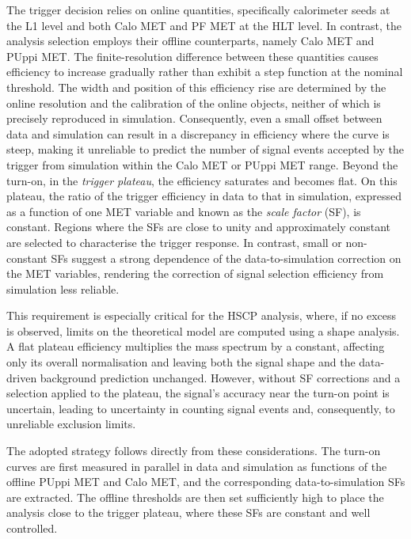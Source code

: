 The trigger decision relies on online quantities, specifically calorimeter seeds at the L1 level and both Calo MET and PF MET at the HLT level. In contrast, the analysis selection employs their offline counterparts, namely Calo MET and PUppi MET. The finite-resolution difference between these quantities causes efficiency to increase gradually rather than exhibit a step function at the nominal threshold. The width and position of this efficiency rise are determined by the online resolution and the calibration of the online objects, neither of which is precisely reproduced in simulation. Consequently, even a small offset between data and simulation can result in a discrepancy in efficiency where the curve is steep, making it unreliable to predict the number of signal events accepted by the trigger from simulation within the Calo MET or PUppi MET range. Beyond the turn-on, in the \textit{trigger plateau}, the efficiency saturates and becomes flat. On this plateau, the ratio of the trigger efficiency in data to that in simulation, expressed as a function of one MET variable and known as the \textit{scale factor} (SF), is constant. Regions where the SFs are close to unity and approximately constant are selected to characterise the trigger response. In contrast, small or non-constant SFs suggest a strong dependence of the data-to-simulation correction on the MET variables, rendering the correction of signal selection efficiency from simulation less reliable.

This requirement is especially critical for the HSCP analysis, where, if no excess is observed, limits on the theoretical model are computed using a shape analysis. A flat plateau efficiency multiplies the mass spectrum by a constant, affecting only its overall normalisation and leaving both the signal shape and the data-driven background prediction unchanged. However, without SF corrections and a selection applied to the plateau, the signal's accuracy near the turn-on point is uncertain, leading to uncertainty in counting signal events and, consequently, to unreliable exclusion limits.

The adopted strategy follows directly from these considerations. The turn-on curves are first measured in parallel in data and simulation as functions of the offline PUppi MET and Calo MET, and the corresponding data-to-simulation SFs are extracted. The offline thresholds are then set sufficiently high to place the analysis close to the trigger plateau, where these SFs are constant and well controlled.


